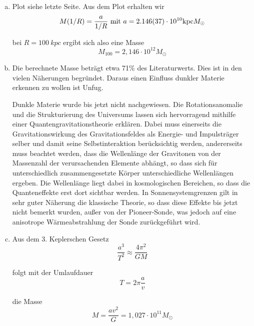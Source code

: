 \documentclass[a4paper,german,12pt,smallheadings]{scrartcl}
\begin{document}
\begin{enumerate}[a)]
  \item
    Plot siehe letzte Seite. Aus dem Plot erhalten wir
    \begin{equation}
    M(1/R) = \frac{a}{1/R} \text{ mit } a = \num{2.146+-0.037} \cdot 10^{10} \mathrm{kpc} M_\odot
    \end{equation}

    bei $R = \SI{100}{kpc}$ ergibt sich also eine Masse
    \begin{equation}
      M_{100} = 2{,}146 \cdot 10^{12} M_\odot
    \end{equation}
  \item
    Die berechnete Masse beträgt etwa 71\% des Literaturwerts. Dies ist in den
    vielen Näherungen begründet. Daraus einen Einfluss dunkler Materie erkennen
    zu wollen ist Unfug.

    Dunkle Materie wurde bis jetzt nicht nachgewiesen. Die Rotationsanomalie
    und die Strukturierung des Universums lassen sich hervorragend mithilfe
    einer Quantengravitationstheorie erklären. Dabei muss einerseits die
    Gravitationswirkung des Gravitationsfeldes als Energie- und Impulsträger
    selber und damit seine Selbstinteraktion berücksichtig werden, andererseits
    muss beachtet werden, dass die Wellenlänge der Gravitonen von der
    Massenzahl der verursachenden Elemente abhängt, so dass sich für
    unterschiedlich zusammengesetzte Körper unterschiedliche Wellenlängen
    ergeben. Die Wellenlänge liegt dabei in kosmologischen Bereichen, so dass
    die Quanteneffekte erst dort sichtbar werden. In Sonnensystemgrenzen gilt
    in sehr guter Näherung die klassische Theorie, so dass diese Effekte bis
    jetzt nicht bemerkt wurden, außer von der Pioneer-Sonde, was jedoch auf
    eine anisotrope Wärmeabstrahlung der Sonde zurückgeführt wird.

  \item
    Aus dem 3. Keplerschen Gesetz
    \begin{equation}
      \frac{a^3}{T^2} \approx \frac{4 \pi^2}{GM}
    \end{equation}

    folgt mit der Umlaufdauer
    \begin{equation}
      T = 2 \pi \frac{a}{v}
    \end{equation}

    die Masse
    \begin{equation}
      M = \frac{a v^2}{G} = 1{,}027 \cdot 10^{11} M_\odot
    \end{equation}


\end{enumerate}
\end{document}
